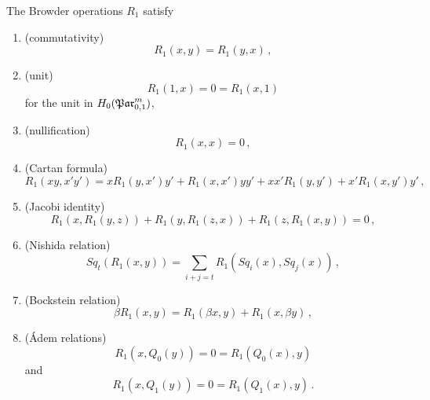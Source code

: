 \begin{prop}
    The Browder operations $R_1$ satisfy
    \begin{enumerate}
        \item (commutativity)
            \[
                R_1(x,y) = R_1(y,x) \,,
            \]
        \item (unit)
            \[
                R_1(1,x) = 0 = R_1(x,1)
            \]
            for the unit in $H_0(\mathfrak{Par}_{0,1}^m)$,
        \item (nullification)
            \[
                R_1(x,x) = 0 \,,
            \]
        \item (Cartan formula)
            \[
                R_1(xy, x'y') = xR_1(y,x')y' + R_1(x,x')yy' + xx'R_1(y,y') + x'R_1(x,y')y' \,,
            \]
        \item (Jacobi identity)
            \[
                R_1(x, R_1(y,z)) + R_1(y, R_1(z,x)) + R_1(z, R_1(x,y)) = 0 \,,
            \]
        \item (Nishida relation)
            \[
                Sq_t(R_1(x,y)) = \sum_{i+j=t} R_1(Sq_i(x), Sq_j(x)) \,,
            \]
        \item (Bockstein relation)
            \[
                \beta R_1(x,y) = R_1(\beta x, y) + R_1(x, \beta y) \,,
            \]
        \item (Ádem relations)
            \[
                R_1(x, Q_0(y)) = 0 = R_1(Q_0(x),y)
            \]
            and
            \[
                R_1(x, Q_1(y)) = 0 = R_1(Q_1(x),y) \,.
            \]
    \end{enumerate}
\end{prop}
